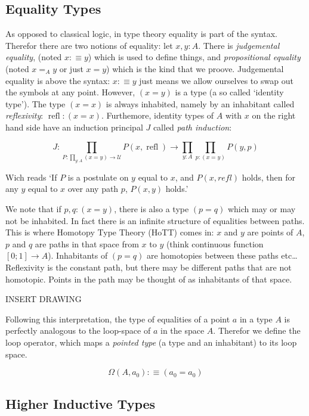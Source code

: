 \documentclass{article}
\DeclareMathOperator{\refl}{refl}
\begin{document}
\subsection{Equality Types}

As opposed to classical logic, in type theory equality is part of the syntax. Therefor there are two notions of equality: let $x,y : A$. There is \emph{judgemental equality}, (noted $x :\equiv y$) which is used to define things, and \emph{propositional equality} (noted $x =_{A} y$ or just $x = y$) which is the kind that we proove. Judgemental equality is above the syntax: $x :\equiv y$ just means we allow ourselves to swap out the symbols at any point. However, $(x = y)$ is a type (a so called `identity type'). The type $(x = x)$ is always inhabited, namely by an inhabitant called \emph{reflexivity}: $\refl : (x = x)$. Furthemore, identity types of $A$ with $x$ on the right hand side have an induction principal $J$ called \emph{path induction}:

\[J : \prod_{P : \prod_{y : A} (x = y) \to \mathcal{U}} P(x, \refl) \to \prod_{y: A} \prod_{p : (x = y)} P(y,p)\]

Wich reads `If $P$ is a postulate on $y$ equal to $x$, and $P(x,refl)$ holds, then for any $y$ equal to $x$ over any path $p$, $P(x,y)$ holds.'

We note that if $p,q : (x = y)$, there is also a type $(p = q)$ which may or may not be inhabited. In fact there is an infinite structure of equalities between paths. This is where Homotopy Type Theory (HoTT) comes in: $x$ and $y$ are points of $A$, $p$ and $q$ are paths in that space from $x$ to $y$ (think continuous function $\left[ 0;1\right] \to A$). Inhabitants of $(p = q)$ are homotopies between these paths etc\ldots Reflexivity is the constant path, but there may be different paths that are not homotopic. Points in the path may be thought of as inhabitants of that space.

INSERT DRAWING

Following this interpretation, the type of equalities of a point $a$ in a type $A$ is perfectly analogous to the loop-space of $a$ in the space $A$. Therefor we define the loop operator, which maps a \emph{pointed type} (a type and an inhabitant) to its loop space.

\[\Omega(A , a_0) :\equiv (a_0 = a_0)\]

\subsection{Higher Inductive Types}
\end{document}
